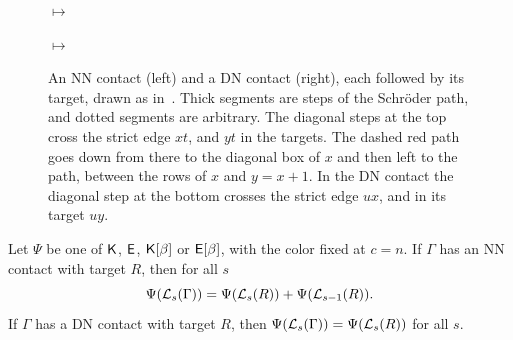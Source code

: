 \begin{figure}[!ht]
\centering
{}
\;$\longmapsto$\;
\qquad\qquad
{}
\;$\longmapsto$\;
\caption{An NN contact (left) and a DN contact (right), each followed by its
target, drawn as in~\cite[(3), (4)]{AlexanderssonSulzgruber2022}.
Thick segments are steps of the Schröder path, and dotted segments are
arbitrary.
The diagonal steps at the top cross the strict edge $xt$, and $yt$ in the
targets.
The dashed red path goes down from there to the diagonal box of $x$ and then left to
the path, between the rows of $x$ and $y=x+1$.
In the DN contact the diagonal step at the bottom crosses the strict edge $ux$,
and in its target $uy$.}
\label{fig:contacts}
\end{figure}

\begin{proposition}\label{prop:layer}
Let $\Psi$ be one of $\mathsf{K}$, $\mathsf{E}$, $\mathsf{K}[\beta]$ or $\mathsf{E}[\beta]$, with the color
fixed at $c=n$.
If $\Gamma$ has an NN contact with target $R$, then for all $s$
\[
 \Psi(\mathcal{L}_s(\Gamma))=\Psi(\mathcal{L}_s(R))+\Psi(\mathcal{L}_{s-1}(R)).
\]
If $\Gamma$ has a DN contact with target $R$, then $\Psi(\mathcal{L}_s(\Gamma))=\Psi(\mathcal{L}_s(R))$
for all $s$.
\end{proposition}

